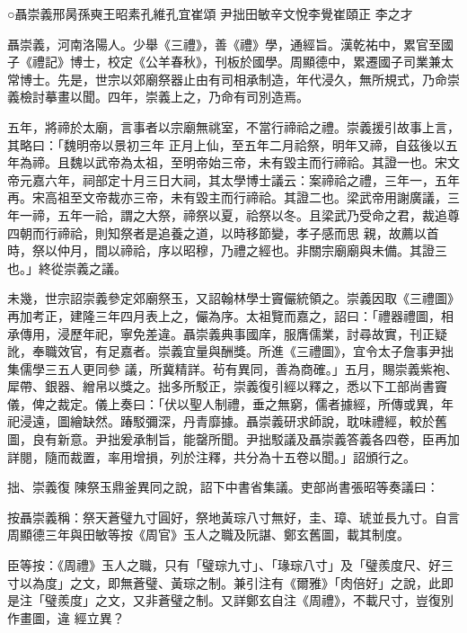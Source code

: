 
\begin{pinyinscope}
○聶崇義邢昺孫奭王昭素孔維孔宜崔頌
 尹拙田敏辛文悅李覺崔頤正
  李之才



 聶崇義，河南洛陽人。少舉《三禮》，善《禮》學，通經旨。漢乾祐中，累官至國子《禮記》博士，校定《公羊春秋》，刊板於國學。周顯德中，累遷國子司業兼太常博士。先是，世宗以郊廟祭器止由有司相承制造，年代浸久，無所規式，乃命崇義檢討摹畫以聞。四年，崇義上之，乃命有司別造焉。



 五年，將禘於太廟，言事者以宗廟無祧室，不當行禘祫之禮。崇義援引故事上言，其略曰：「魏明帝以景初三年
 正月上仙，至五年二月祫祭，明年又禘，自茲後以五年為禘。且魏以武帝為太祖，至明帝始三帝，未有毀主而行禘祫。其證一也。宋文帝元嘉六年，祠部定十月三日大祠，其太學博士議云：案禘祫之禮，三年一，五年再。宋高祖至文帝裁亦三帝，未有毀主而行禘祫。其證二也。梁武帝用謝廣議，三年一禘，五年一祫，謂之大祭，禘祭以夏，祫祭以冬。且梁武乃受命之君，裁追尊四朝而行禘祫，則知祭者是追養之道，以時移節變，孝子感而思
 親，故薦以首時，祭以仲月，間以禘祫，序以昭穆，乃禮之經也。非關宗廟廟與未備。其證三也。」終從崇義之議。



 未幾，世宗詔崇義參定郊廟祭玉，又詔翰林學士竇儼統領之。崇義因取《三禮圖》再加考正，建隆三年四月表上之，儼為序。太祖覽而嘉之，詔曰：「禮器禮圖，相承傳用，浸歷年祀，寧免差違。聶崇義典事國庠，服膺儒業，討尋故實，刊正疑訛，奉職效官，有足嘉者。崇義宜量與酬獎。所進《三禮圖》，宜令太子詹事尹拙集儒學三五人更同參
 議，所冀精詳。茍有異同，善為商確。」五月，賜崇義紫袍、犀帶、銀器、繒帛以獎之。拙多所駁正，崇義復引經以釋之，悉以下工部尚書竇儀，俾之裁定。儀上奏曰：「伏以聖人制禮，垂之無窮，儒者據經，所傳或異，年祀浸遠，圖繪缺然。踳駁彌深，丹青靡據。聶崇義研求師說，耽味禮經，較於舊圖，良有新意。尹拙爰承制旨，能罄所聞。尹拙駁議及聶崇義答義各四卷，臣再加詳閱，隨而裁置，率用增損，列於注釋，共分為十五卷以聞。」詔頒行之。



 拙、崇義復
 陳祭玉鼎釜異同之說，詔下中書省集議。吏部尚書張昭等奏議曰：



 按聶崇義稱：祭天蒼璧九寸圓好，祭地黃琮八寸無好，圭、璋、琥並長九寸。自言周顯德三年與田敏等按《周官》玉人之職及阮諶、鄭玄舊圖，載其制度。



 臣等按：《周禮》玉人之職，只有「璧琮九寸」、「瑑琮八寸」及「璧羨度尺、好三寸以為度」之文，即無蒼璧、黃琮之制。兼引注有《爾雅》「肉倍好」之說，此即是注「璧羨度」之文，又非蒼璧之制。又詳鄭玄自注《周禮》，不載尺寸，豈復別作畫圖，違
 經立異？




\end{pinyinscope}
